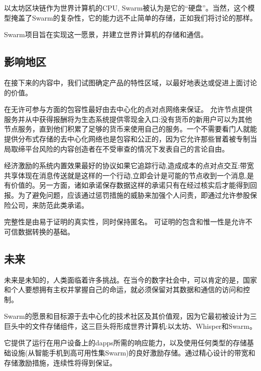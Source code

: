  
以太坊区块链作为世界计算机的CPU, Swarm被认为是它的“硬盘”。当然，这个模型掩盖了Swarm的复杂性，它的能力远不止简单的存储，正如我们将讨论的那样。

Swarm项目旨在实现这一愿景，并建立世界计算机的存储和通信。 

\subsection{影响地区\statusorange}

在接下来的内容中，我们试图确定产品的特性区域，以最好地表达或促进上面讨论的价值。

在无许可参与方面的包容性最好由去中心化的点对点网络来保证。
允许节点提供服务并从中获得报酬将为生态系统提供零现金入口:没有货币的新用户可以为其他节点服务，直到他们积累了足够的货币来使用自己的服务。一个不需要看门人就能提供分布式存储的去中心化网络也是包容和公正的，因为它允许那些冒着被专制当局取缔平台风险的内容创造者在不受审查的情况下发表自己的言论自由。

经济激励的系统内置效果最好的协议如果它追踪行动,造成成本的点对点交互:带宽共享体现在消息传送就是这样的一个行动,立即会计是可能的节点收到一个消息,是有价值的。另一方面，诸如承诺保存数据这样的承诺只有在经过核实后才能得到回报。为了避免问题，应该通过惩罚措施的威胁来加强个人问责，即通过允许参股保险公司，来防范此类承诺。

完整性是由易于证明的真实性，同时保持匿名。
可证明的包含和惟一性是允许不可信数据转换的基础。


\subsection{未来} \label{sec:future}

未来是未知的，人类面临着许多挑战。在当今的数字社会中，可以肯定的是，国家和个人要想拥有主权并掌握自己的命运，就必须保留对其数据和通信的访问和控制。

Swarm的愿景和目标源于去中心化的技术社区及其价值观，因为它最初被设计为三巨头中的文件存储组件，这三巨头将形成世界计算机:以太坊、Whisper和Swarm。

它提供了运行在用户设备上的dapps所需的响应能力，以及使用任何类型的存储基础设施(从智能手机到高可用性集Swarm)的良好激励存储。通过精心设计的带宽和存储激励措施，连续性将得到保证。

